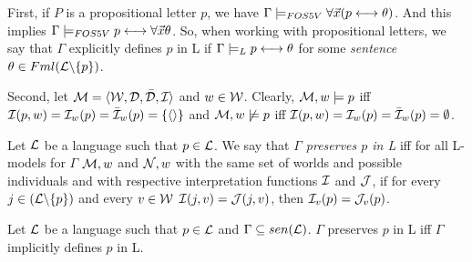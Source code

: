 \qquad First, if $P$ is a propositional letter $p$, we have $\Gamma \models_{FOS5V} \forall \vec{x} (p \longleftrightarrow \theta)$. And this implies $\Gamma \models_{FOS5V} p \longleftrightarrow \forall \vec{x} \theta$. So, when working with propositional letters, we say that $\Gamma$ explicitly defines $p$ in L if $\Gamma \models_{L} p \longleftrightarrow \theta$ for some \textit{sentence} $\theta \in Fml(\mathcal{L} \backslash \{p\})$.

\qquad Second, let  $\mathcal{M} = \langle\mathcal{W},\mathcal{D}, \bar{\mathcal{D}},\mathcal{I}\rangle$ and $w \in \mathcal{W}$. Clearly, $\mathcal{M},w \models p$ iff $\mathcal{I}(p,w)= \mathcal{I}_{w}(p) = \bar{\mathcal{I}}_{w}(p) = \{\langle \rangle \}$ and $\mathcal{M},w \not\models p$ iff $\mathcal{I}(p,w)= \mathcal{I}_{w}(p) = \bar{\mathcal{I}}_{w}(p) = \emptyset$.

\begin{defn}
Let $\mathcal{L}$ be a language such that $p \in \mathcal{L}$. We say that \textit{$\Gamma$ preserves $p$ in L} iff for all L-models for $\Gamma$ $\mathcal{M},w$ and $\mathcal{N},w$ with the same set of worlds and possible individuals and with respective interpretation functions $\mathcal{I}$ and $\mathcal{J}$, if for every $j \in (\mathcal{L} \backslash \{p\})$ and every $v \in \mathcal{W}$ $\mathcal{I}(j,v) = \mathcal{J}(j,v)$, then $\mathcal{I}_{v}(p) = \mathcal{J}_{v}(p)$. 

\end{defn}

\begin{pro}
Let $\mathcal{L}$ be a language such that $p \in \mathcal{L}$ and $\Gamma \subseteq sen(\mathcal{L})$. $\Gamma$ preserves $p$ in L iff $\Gamma$ implicitly defines $p$ in L.  
\end{pro}

